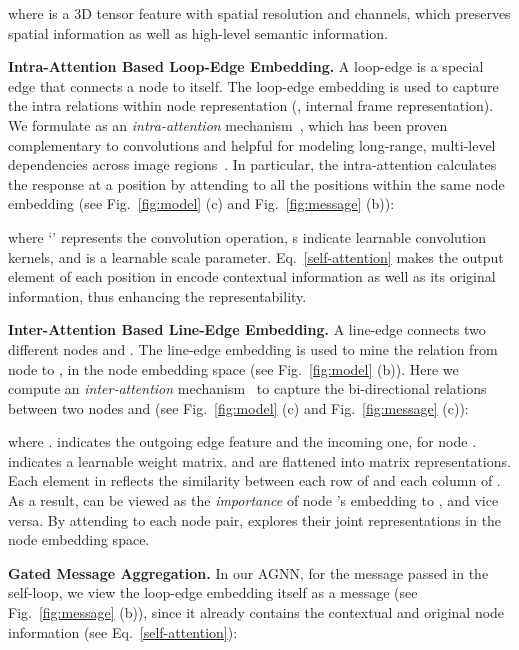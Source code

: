 \documentclass[10pt,twocolumn,letterpaper]{article}
\begin{document}
where  is a 3D tensor feature with  spatial resolution and  channels, which preserves spatial information as well as high-level semantic information.

\noindent\textbf{Intra-Attention Based Loop-Edge Embedding.} A loop-edge  is a special edge that connects a node to itself. The loop-edge embedding  is used to capture the intra relations within node representation  (\ie, internal frame representation).
We formulate  as an \textit{intra-attention} mechanism~\cite{DBLP:conf/nips/VaswaniSPUJGKP17,wang2018non}, which has been proven complementary to convolutions and helpful for modeling long-range, multi-level dependencies across
image regions~\cite{zhang2018self}. In particular, the intra-attention calculates the response at a position by attending to all the positions within the same node embedding (see Fig.~\ref{fig:model} (c)  and Fig.~\ref{fig:message} (b)):
	\vspace*{-3pt}

where \!`'\! represents the convolution operation, s indicate learnable convolution kernels, and  is a learnable scale parameter. Eq.~\ref{self-attention} makes the output element of each position in   encode contextual information as well as its original information, thus enhancing the representability.

\noindent\textbf{Inter-Attention Based Line-Edge Embedding.}  A line-edge  connects two different nodes  and . The line-edge embedding  is used to mine the relation from node  to , in the node embedding space (see Fig.~\ref{fig:model} (b)).  Here we compute an \textit{inter-attention} mechanism~\cite{lu2016hierarchical} to capture the bi-directional relations between two nodes  and  (see Fig.~\ref{fig:model} (c) and Fig.~\ref{fig:message} (c)):
	\vspace*{-3pt}

where .   indicates the outgoing edge feature and  the incoming one, for node .  indicates a learnable weight matrix.  and   are flattened into matrix representations. Each element in  reflects the similarity between each row of  and each column of . As a result,  can be viewed as the \textit{importance} of node 's embedding to , and vice versa. By attending to each node pair,  explores their joint representations in the node embedding space.   

\noindent\textbf{Gated Message Aggregation.}
In our AGNN, for the message passed in the self-loop, we view the loop-edge embedding  itself as a message (see Fig.~\ref{fig:message} (b)), since it already contains the contextual and original node information (see Eq.~\ref{self-attention}):
	\vspace*{-3pt}
\end{document}
